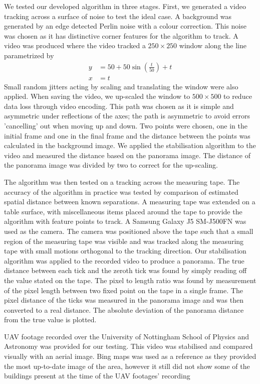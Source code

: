 We tested our developed algorithm in three stages.
First, we generated a video tracking across a surface of noise to test the ideal case.
A background was generated by an edge detected Perlin noise \cite{Perlin1985} with a colour correction.
This noise was chosen as it has distinctive corner features for the algorithm to track.
A video was produced where the video tracked a $250\times250$ window along the line parametrized by
\begin{align}
  y & = 50 + 50\sin{\left(\frac{t}{50}\right)} + t \\
	x & = t 
\end{align}
Small random jitters acting by scaling and translating the window were also applied.
When saving the video, we up-scaled the window to $500\times500$ to reduce data loss through video encoding.
This path was chosen as it is simple and asymmetric under reflections of the axes;
the path is asymmetric to avoid errors 'cancelling' out when moving up and down.
Two points were chosen, one in the initial frame and one in the final frame and
the distance between the points was calculated in the background image.
We applied the stabilisation algorithm to the video and measured the distance based on the panorama image.
The distance of the panorama image was divided by two to correct for the up-scaling.

The algorithm was then tested on a tracking across the measuring tape.
The accuracy of the algorithm in practice was tested by comparison of estimated spatial distance between known separations.
A measuring tape was extended on a table surface, with miscellaneous items placed around the tape to provide the algorithm with feature points to track.
A Samsung Galaxy J5 SM-J500FN was used as the camera.
The camera was positioned above the tape such that a small region of the measuring tape was visible and was
tracked along the measuring tape with small motions orthogonal to the tracking direction.
Our stabilisation algorithm was applied to the recorded video to produce a panorama.
The true distance between each tick and the zeroth tick was found by simply reading off the value stated on the tape.
The pixel to length ratio was found by measurement of the pixel length between two fixed point on the tape in a single frame.
The pixel distance of the ticks was measured in the panorama image and was then converted to a real distance.
The absolute deviation of the panorama distance from the true value is plotted.

UAV footage recorded over the University of Nottingham School of Physics and Astronomy was provided for our testing.
This video was stabilised and compared visually with an aerial image.
Bing maps was used as a reference as they provided the most up-to-date image of the area, 
however it still did not show some of the buildings present at the time of the UAV footages' recording
